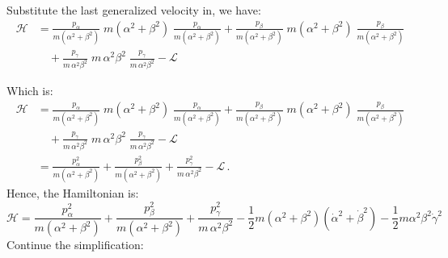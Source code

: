 Substitute the last generalized velocity in, we have: 
\begin{equation}
\begin{aligned}
\mathcal{H}
&= \frac{p_{\alpha}}{m\left(\alpha^{2}+\beta^{2}\right)}
   \;m\left(\alpha^{2}+\beta^{2}\right)\;
   \frac{p_{\alpha}}{m\left(\alpha^{2}+\beta^{2}\right)} 
 + \frac{p_{\beta}}{m\left(\alpha^{2}+\beta^{2}\right)}
   \;m\left(\alpha^{2}+\beta^{2}\right)\;
   \frac{p_{\beta}}{m\left(\alpha^{2}+\beta^{2}\right)} \\
&\quad
 + \frac{p_{\gamma}}{m\,\alpha^{2}\beta^{2}}
   \;m\,\alpha^{2}\beta^{2}\;
   \frac{p_{\gamma}}{m\,\alpha^{2}\beta^{2}}
 - \mathcal{L}
\end{aligned}
\end{equation}

Which is: 
\begin{equation}
\begin{aligned}
\mathcal{H}
&= \frac{p_{\alpha}}{m\left(\alpha^{2}+\beta^{2}\right)}
   \;m\left(\alpha^{2}+\beta^{2}\right)\;
   \frac{p_{\alpha}}{m\left(\alpha^{2}+\beta^{2}\right)}
 + \frac{p_{\beta}}{m\left(\alpha^{2}+\beta^{2}\right)}
   \;m\left(\alpha^{2}+\beta^{2}\right)\;
   \frac{p_{\beta}}{m\left(\alpha^{2}+\beta^{2}\right)}\\
&\quad
 + \frac{p_{\gamma}}{m\,\alpha^{2}\beta^{2}}
   \;m\,\alpha^{2}\beta^{2}\;
   \frac{p_{\gamma}}{m\,\alpha^{2}\beta^{2}}
 - \mathcal{L}\\
&= \frac{p_{\alpha}^{2}}{m\left(\alpha^{2}+\beta^{2}\right)}
 + \frac{p_{\beta}^{2}}{m\left(\alpha^{2}+\beta^{2}\right)}
 + \frac{p_{\gamma}^{2}}{m\,\alpha^{2}\beta^{2}}
 - \mathcal{L}\,.
\end{aligned}
\end{equation}
Hence, the Hamiltonian is: 
\begin{equation}
    \mathcal{H} =\frac{p_{\alpha}^{2}}{m\left(\alpha^{2}+\beta^{2}\right)}
 + \frac{p_{\beta}^{2}}{m\left(\alpha^{2}+\beta^{2}\right)}
 + \frac{p_{\gamma}^{2}}{m\,\alpha^{2}\beta^{2}}
 - \frac{1}{2}m (\alpha^{2}+ \beta^{2}) (\dot{\alpha}^{2} + \dot{\beta}^{2})- \frac{1}{2}m\alpha^{2}\beta^{2}\dot{\gamma}^{2}
\end{equation}
Continue the simplification:
